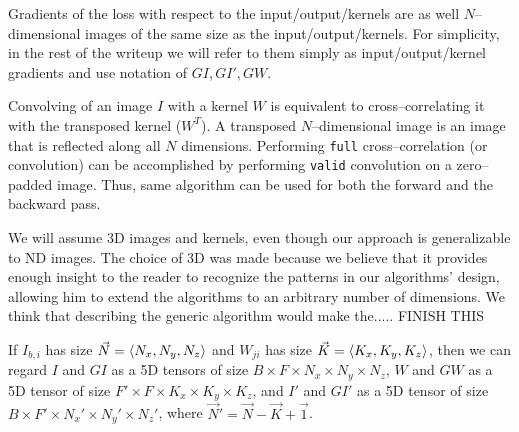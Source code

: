   Gradients of the loss with respect to the input/output/kernels are
  as well $N$--dimensional images of the same size as the
  input/output/kernels.  For simplicity, in the rest of the writeup we
  will refer to them simply as input/output/kernel gradients and use
  notation of $GI, GI', GW$.

  Convolving of an image $I$ with a kernel $W$ is equivalent to
  cross--correlating it with the transposed kernel ($W^T$).  A
  transposed $N$--dimensional image is an image that is reflected
  along all $N$ dimensions.  Performing \texttt{full}
  cross--correlation (or convolution) can be accomplished by
  performing \texttt{valid} convolution on a zero--padded image.
  Thus, same algorithm can be used for both the forward and the
  backward pass.

  We will assume 3D images and kernels, even though our approach is
  generalizable to ND images.  The choice of 3D was made because we
  believe that it provides enough insight to the reader to recognize
  the patterns in our algorithms' design, allowing him to extend the
  algorithms to an arbitrary number of dimensions.  We think that
  describing the generic algorithm would make the..... FINISH THIS


  If $I_{b,i}$ has size $\vec{N} = \langle N_x, N_y, N_z\rangle$ and
  $W_{ji}$ has size $\vec{K} = \langle K_x,K_y,K_z\rangle$, then we can
  regard $I$ and $GI$ as a 5D tensors of size $B \times F \times N_x
  \times N_y \times N_z$, $W$ and $GW$ as a 5D tensor of size $F'
  \times F \times K_x \times K_y \times K_z$, and $I'$ and $GI'$ as a
  5D tensor of size $B \times F' \times N_x' \times N_y' \times N_z'$,
  where $\vec{N}' = \vec{N} - \vec{K} + \vec{1}$.
